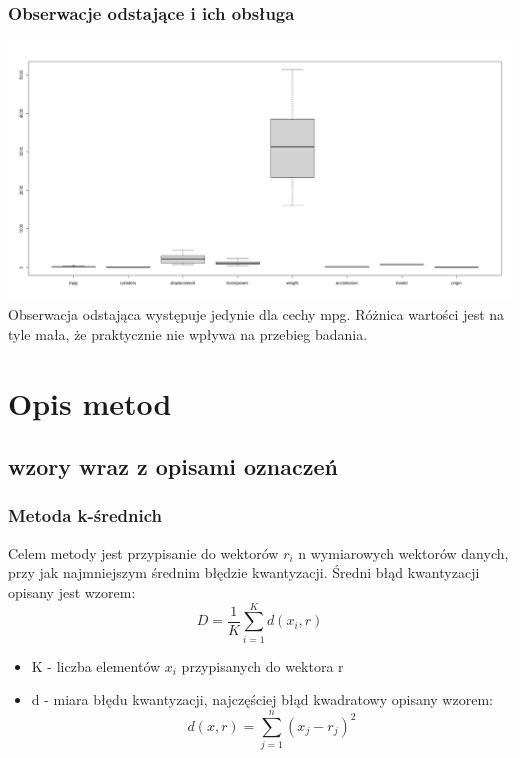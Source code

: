 \documentclass{article}
\begin{document}
        \subsubsection*{Obserwacje odstające i ich obsługa}
            \includegraphics[width=\textwidth]{../boxplots/boxplot_noscale_fig.jpeg}
            Obserwacja odstająca występuje jedynie dla cechy mpg. Różnica wartości jest na tyle mała,
            że praktycznie nie wpływa na przebieg badania.
            

\section{Opis metod}
    \subsection{wzory wraz z opisami oznaczeń}
        \subsubsection*{Metoda k-średnich}
        Celem metody jest przypisanie do wektorów $r_i$ n wymiarowych wektorów danych,
        przy jak najmniejszym średnim błędzie kwantyzacji.
        Średni błąd kwantyzacji opisany jest wzorem:
            \begin{equation*}
                D = \frac{1}{K}\sum_{i=1}^{K} d(x_i, r)
            \end{equation*}
            \begin{itemize}
                \item K - liczba elementów ${x_i}$ przypisanych do wektora r
                \item d - miara błędu kwantyzacji, najczęściej błąd kwadratowy opisany wzorem:
                \begin{equation*}
                    d(x,r) = \sum_{j=1}^{n} (x_j - r_j)^2
                \end{equation*}
            \end{itemize}
\end{document}
